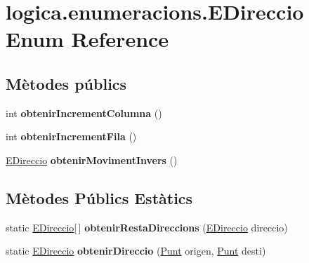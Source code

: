 \hypertarget{enumlogica_1_1enumeracions_1_1_e_direccio}{\section{logica.\+enumeracions.\+E\+Direccio Enum Reference}
\label{enumlogica_1_1enumeracions_1_1_e_direccio}
}
\subsection*{Mètodes públics}
\begin{DoxyCompactItemize}
\item 
\hypertarget{enumlogica_1_1enumeracions_1_1_e_direccio_ac95461b810966d7a55c313d3f74deedf}{int {\bfseries obtenir\+Increment\+Columna} ()}\label{enumlogica_1_1enumeracions_1_1_e_direccio_ac95461b810966d7a55c313d3f74deedf}

\item 
\hypertarget{enumlogica_1_1enumeracions_1_1_e_direccio_ae89a8e6f2f3bdc9929a11de804980e33}{int {\bfseries obtenir\+Increment\+Fila} ()}\label{enumlogica_1_1enumeracions_1_1_e_direccio_ae89a8e6f2f3bdc9929a11de804980e33}

\item 
\hypertarget{enumlogica_1_1enumeracions_1_1_e_direccio_a7063f6f72b73cb481b8473fdf02b5f06}{\hyperlink{enumlogica_1_1enumeracions_1_1_e_direccio}{E\+Direccio} {\bfseries obtenir\+Moviment\+Invers} ()}\label{enumlogica_1_1enumeracions_1_1_e_direccio_a7063f6f72b73cb481b8473fdf02b5f06}

\end{DoxyCompactItemize}
\subsection*{Mètodes Públics Estàtics}
\begin{DoxyCompactItemize}
\item 
\hypertarget{enumlogica_1_1enumeracions_1_1_e_direccio_ac019f4bab5267103dd6ff026bbc45851}{static \hyperlink{enumlogica_1_1enumeracions_1_1_e_direccio}{E\+Direccio}\mbox{[}$\,$\mbox{]} {\bfseries obtenir\+Resta\+Direccions} (\hyperlink{enumlogica_1_1enumeracions_1_1_e_direccio}{E\+Direccio} direccio)}\label{enumlogica_1_1enumeracions_1_1_e_direccio_ac019f4bab5267103dd6ff026bbc45851}

\item 
\hypertarget{enumlogica_1_1enumeracions_1_1_e_direccio_a7457407bffa5aa784ca1ca8c8b50b136}{static \hyperlink{enumlogica_1_1enumeracions_1_1_e_direccio}{E\+Direccio} {\bfseries obtenir\+Direccio} (\hyperlink{classlogica_1_1_punt}{Punt} origen, \hyperlink{classlogica_1_1_punt}{Punt} desti)}\label{enumlogica_1_1enumeracions_1_1_e_direccio_a7457407bffa5aa784ca1ca8c8b50b136}

\end{DoxyCompactItemize}
